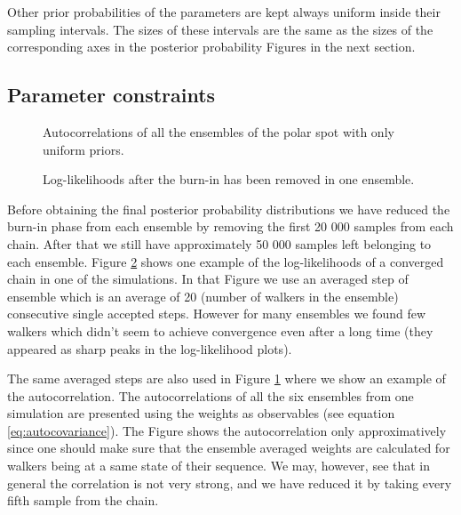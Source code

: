 \documentclass{wihuri}
\begin{document}
Other prior probabilities of the parameters are kept always uniform inside their sampling intervals. The sizes of these intervals are the same as the sizes of the corresponding axes in the posterior probability Figures in the next section. 



\subsection{Parameter constraints}

\begin{figure}
\centerline{}
\caption{Autocorrelations of all the ensembles of the polar spot with only uniform priors.
\label{fig:acexample}}
\end{figure}


\begin{figure}
\centerline{}
\caption{Log-likelihoods after the burn-in has been removed in one ensemble.
\label{fig:wexample}}
\end{figure}

Before obtaining the final posterior probability distributions we have reduced the burn-in phase from each ensemble by removing the first 20 000 samples from each chain. After that we still have approximately 50 000 samples left belonging to each ensemble.  Figure \ref{fig:wexample} shows one example of the log-likelihoods of a converged chain in one of the simulations. In that Figure we use an averaged step of ensemble which is an average of 20 (number of walkers in the ensemble) consecutive single accepted steps. However for many ensembles we found few walkers which didn't seem to achieve convergence even after a long time (they appeared as sharp peaks in the log-likelihood plots).

The same averaged steps are also used in Figure \ref{fig:acexample} where we show an example of the autocorrelation. The autocorrelations of all the six ensembles from one simulation are presented using the weights as observables (see equation \ref{eq:autocovariance}). The Figure shows the autocorrelation only approximatively since one should make sure that the ensemble averaged weights are calculated for walkers being at a same state of their sequence. We may, however, see that in general the correlation is not very strong, and we have reduced it by taking every fifth sample from the chain.%
\end{document}
